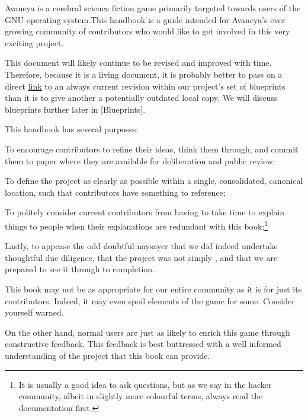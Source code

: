 

Avaneya is a cerebral science fiction game primarily targeted towards users of the GNU operating system. This handbook is a guide intended for Avaneya's ever growing community of contributors who would like to get involved in this very exciting project.

This document will likely continue to be revised and improved with time. Therefore, because it is a living document, it is probably better to pass on a direct \href{\LatestHandbookURL}{link} to an always current revision within our project's set of blueprints than it is to give another a potentially outdated local copy. We will discuss blueprints further later in [Blueprints].

This handbook has several purposes:

\startitemize[4]
\item
To encourage contributors to refine their ideas, think them through, and commit them to paper where they are available for deliberation and public review;

\item
To define the project as clearly as possible within a single, consolidated, canonical location, such that contributors have something to reference;

\item
To politely consider current contributors from having to take time to explain things to people when their explanations are redundant with this book;\footnote[rtfm]{It is usually a good idea to ask questions, but as we say in the hacker community, albeit in slightly more colourful terms, always read the documentation first.}

\item
Lastly, to appease the odd doubtful naysayer that we did indeed undertake thoughtful due diligence, that the project was not simply , and that we are prepared to see it through to completion.
\stopitemize

This book may not be as appropriate for our entire community as it is for just its contributors. Indeed, it may even spoil elements of the game for some. Consider yourself warned. 

On the other hand, normal users are just as likely to enrich this game through constructive feedback. This feedback is best buttressed with a well informed understanding of the project that this book can provide.

\StopChapter
